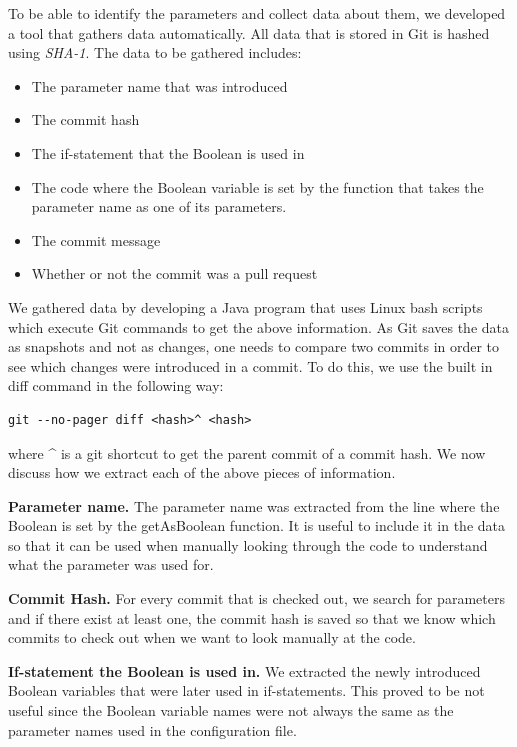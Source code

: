 To be able to identify the parameters and collect data about them, we developed a tool that gathers data automatically. All data that is stored in Git is hashed using \textit{SHA-1}. The data to be gathered includes:
\begin{itemize}
\item The parameter name that was introduced
\item The commit hash
\item The if-statement that the Boolean is used in
\item The code where the Boolean variable is set by the function that takes the parameter name as one of its parameters.
\item The commit message
\item Whether or not the commit was a pull request
\end{itemize}
We gathered data by developing a Java program that uses Linux bash scripts which execute Git commands to get the above information. As Git saves the data as snapshots and not as changes, one needs to compare two commits in order to see which changes were introduced in a commit. To do this, we use the built in diff command in the following way: %
\lstset{language=Bash,numbers=left,xleftmargin=2em,frame=single,framexleftmargin=1.5em}
\begin{lstlisting}[frame=single,breaklines=true,tabsize=2]
git --no-pager diff <hash>^ <hash>
\end{lstlisting}
where \^{} is a git shortcut to get the parent commit of a commit hash. We now discuss how we extract each of the above pieces of information.

\textbf{Parameter name.} The parameter name was extracted from the line where the Boolean is set by the getAsBoolean function. It is useful to include it in the data so that it can be used when manually looking through the code to understand what the parameter was used for.

\textbf{Commit Hash.} For every commit that is checked out, we search for parameters and if there exist at least one, the commit hash is saved so that we know which commits to check out when we want to look manually at the code.

\textbf{If-statement the Boolean is used in.} We extracted the newly introduced Boolean variables that were later used in if-statements. This proved to be not useful since the Boolean variable names were not always the same as the parameter names used in the configuration file.

